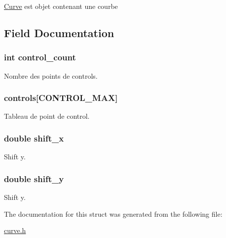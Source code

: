 \hyperlink{struct_curve}{Curve} est objet contenant une courbe 

\subsection{Field Documentation}
\subsubsection[{\texorpdfstring{control\+\_\+count}{control_count}}]{\setlength{\rightskip}{0pt plus 5cm}int control\+\_\+count}\hypertarget{struct_curve_a59a5b03dc125415956c7a70d6ca5f1c9}{}\label{struct_curve_a59a5b03dc125415956c7a70d6ca5f1c9}
Nombre des points de controls. 
\subsubsection[{\texorpdfstring{controls}{controls}}]{ controls\mbox{[}C\+O\+N\+T\+R\+O\+L\+\_\+\+M\+AX\mbox{]}}\hypertarget{struct_curve_a4ee2ee7a61aec07c8125cf99d3aca658}{}\label{struct_curve_a4ee2ee7a61aec07c8125cf99d3aca658}
Tableau de point de control. 
\subsubsection[{\texorpdfstring{shift\+\_\+x}{shift_x}}]{\setlength{\rightskip}{0pt plus 5cm}double shift\+\_\+x}\hypertarget{struct_curve_ae0904aba32ac63f201e7b09c5a369801}{}\label{struct_curve_ae0904aba32ac63f201e7b09c5a369801}
Shift y. 
\subsubsection[{\texorpdfstring{shift\+\_\+y}{shift_y}}]{\setlength{\rightskip}{0pt plus 5cm}double shift\+\_\+y}\hypertarget{struct_curve_acf3ad5e60603cbced782bbebef4e0d06}{}\label{struct_curve_acf3ad5e60603cbced782bbebef4e0d06}
Shift y. 

The documentation for this struct was generated from the following file\+:\begin{DoxyCompactItemize}
\item 
\hyperlink{curve_8h}{curve.\+h}\end{DoxyCompactItemize}
